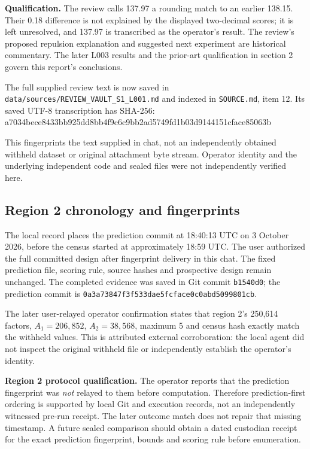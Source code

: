 \documentclass[11pt,a4paper]{article}
\newcommand{\sha}[1]{{\scriptsize\ttfamily #1}\par}
\begin{document}
\textbf{Qualification.} The review calls 137.97 a rounding match to an
earlier 138.15. Their 0.18 difference is not explained by the displayed
two-decimal scores; it is left unresolved, and 137.97 is transcribed as the
operator's result. The review's proposed repulsion explanation and suggested
next experiment are historical commentary. The later L003 results and the
prior-art qualification in section 2 govern this report's conclusions.

The full supplied review text is now saved in
\texttt{data/sources/REVIEW\_VAULT\_S1\_L001.md} and indexed in
\texttt{SOURCE.md}, item 12. Its saved UTF-8 transcription has SHA-256:
\sha{a7034bece8433bb925dd8bb4f9c6c9bb2ad5749fd1b03d9144151cface85063b}
This fingerprints the text supplied in chat, not an independently obtained
withheld dataset or original attachment byte stream. Operator identity and
the underlying independent code and sealed files were not independently
verified here.

\newpage
\subsection*{Region 2 chronology and fingerprints}
The local record places the prediction commit at 18:40:13 UTC on
3 October 2026, before the census started at approximately 18:59 UTC.
The user authorized the full committed design after fingerprint delivery
in this chat. The fixed prediction file, scoring rule, source hashes and
prospective design remain unchanged. The completed evidence was saved in
Git commit \texttt{b1540d0}; the prediction commit is
\texttt{0a3a73847f3f533dae5fcface0c0abd5099801cb}.

The later user-relayed operator confirmation states that region 2's
250,614 factors, $A_1=206{,}852$, $A_2=38{,}568$, maximum 5 and census
hash exactly match the withheld values. This is attributed external
corroboration: the local agent did not inspect the original withheld file
or independently establish the operator's identity.

\textbf{Region 2 protocol qualification.} The operator reports that the prediction
fingerprint was \emph{not} relayed to them before computation. Therefore
prediction-first ordering is supported by local Git and execution records,
not an independently witnessed pre-run receipt. The later outcome match
does not repair that missing timestamp. A future sealed comparison should
obtain a dated custodian receipt for the exact prediction fingerprint,
bounds and scoring rule before enumeration.
\end{document}
